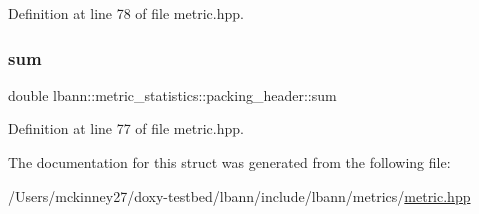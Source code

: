 Definition at line 78 of file metric.\+hpp.

\mbox{\label{structlbann_1_1metric__statistics_1_1packing__header_a33dd5f49566506d8fc5b6662e5c5a40f}} 
\subsubsection{\texorpdfstring{sum}{sum}}
{\footnotesize\ttfamily double lbann\+::metric\+\_\+statistics\+::packing\+\_\+header\+::sum}



Definition at line 77 of file metric.\+hpp.



The documentation for this struct was generated from the following file\+:\begin{DoxyCompactItemize}
\item 
/\+Users/mckinney27/doxy-\/testbed/lbann/include/lbann/metrics/\hyperlink{metric_8hpp}{metric.\+hpp}\end{DoxyCompactItemize}
